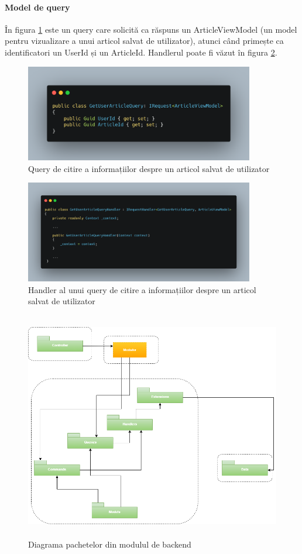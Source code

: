 \paragraph{Model de query}
În figura \ref{fig:getUserArticleQuery} este un query care solicită ca răspuns un ArticleViewModel (un model pentru vizualizare a unui articol salvat de utilizator), atunci când primește ca identificatori un UserId și un ArticleId.
Handlerul poate fi văzut în figura \ref{fig:getUserArticleQueryHandler}.
\begin{figure}[H]
	\centering
	\includegraphics[width=100mm]{figs/getUserArticleQuery.png}
	\caption{Query de citire a informațiilor despre un articol salvat de utilizator}
	\label{fig:getUserArticleQuery}
\end{figure}

\begin{figure}[H]
	\centering
	\includegraphics[width=100mm]{figs/getUserArticleQueryHandler.png}
	\caption{Handler al unui query de citire a informațiilor despre un articol salvat de utilizator}
	\label{fig:getUserArticleQueryHandler}
\end{figure}

\begin{figure}[H]
	\centering
	\includegraphics[width=150mm, height=100mm]{figs/packageBE.png}
	\caption{Diagrama pachetelor din modulul de backend}
	\label{fig:packageBE}
\end{figure}

